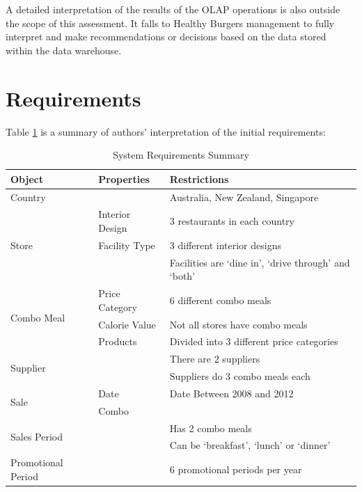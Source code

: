 \documentclass[11pt, a4paper]{article}
\begin{document}
A detailed interpretation of the results of the OLAP operations is also outside the scope of this assessment. It falls to Healthy Burgers management to fully interpret and make recommendations or decisions based on the data stored within the data warehouse.

\section*{Requirements}

Table \ref{tab:requirements} is a summary of authors' interpretation of the initial requirements:

\begin{table}

\begin{tabular}{|l|l|l|}

\hline
\textbf{Object} & \textbf{Properties} & \textbf{Restrictions} \\
\hline

Country & & Australia, New Zealand, Singapore \\
\hline

\multirow{3}{3cm}{Store} & Interior Design  & 3 restaurants in each country \\
 	& Facility Type & 3 different interior designs \\
	& & Facilities are `dine in', `drive through' and `both' \\
\hline

\multirow{3}{3cm}{Combo Meal} & Price Category & 6 different combo meals \\
	& Calorie Value & Not all stores have combo meals \\
	& Products & Divided into 3 different price categories \\ 

\hline

\multirow{2}{3cm}{Supplier} & & There are 2 suppliers \\ 
	& & Suppliers do 3 combo meals each\\
\hline

\multirow{2}{3cm}{Sale} & Date & Date Between 2008 and 2012 \\
	& Combo &  \\
\hline

\multirow{2}{3cm}{Sales Period} & & Has 2 combo meals \\ 
	& & Can be `breakfast', `lunch' or `dinner' \\
\hline	

Promotional Period & & 6 promotional periods per year\\

\hline

\end{tabular}

\caption{System Requirements Summary}
\label{tab:requirements}

\end{table}
\end{document}
